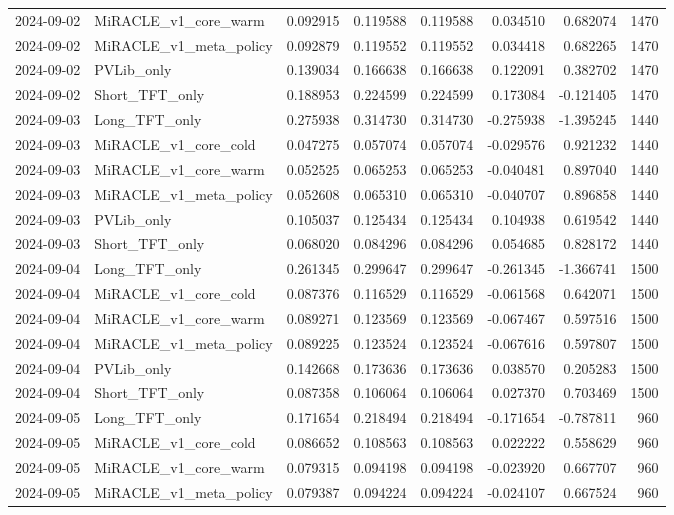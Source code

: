 \begin{tabular}{llrrrrrr}
2024-09-02 & MiRACLE_v1_core_warm & 0.092915 & 0.119588 & 0.119588 & 0.034510 & 0.682074 & 1470 \\
2024-09-02 & MiRACLE_v1_meta_policy & 0.092879 & 0.119552 & 0.119552 & 0.034418 & 0.682265 & 1470 \\
2024-09-02 & PVLib_only & 0.139034 & 0.166638 & 0.166638 & 0.122091 & 0.382702 & 1470 \\
2024-09-02 & Short_TFT_only & 0.188953 & 0.224599 & 0.224599 & 0.173084 & -0.121405 & 1470 \\
2024-09-03 & Long_TFT_only & 0.275938 & 0.314730 & 0.314730 & -0.275938 & -1.395245 & 1440 \\
2024-09-03 & MiRACLE_v1_core_cold & 0.047275 & 0.057074 & 0.057074 & -0.029576 & 0.921232 & 1440 \\
2024-09-03 & MiRACLE_v1_core_warm & 0.052525 & 0.065253 & 0.065253 & -0.040481 & 0.897040 & 1440 \\
2024-09-03 & MiRACLE_v1_meta_policy & 0.052608 & 0.065310 & 0.065310 & -0.040707 & 0.896858 & 1440 \\
2024-09-03 & PVLib_only & 0.105037 & 0.125434 & 0.125434 & 0.104938 & 0.619542 & 1440 \\
2024-09-03 & Short_TFT_only & 0.068020 & 0.084296 & 0.084296 & 0.054685 & 0.828172 & 1440 \\
2024-09-04 & Long_TFT_only & 0.261345 & 0.299647 & 0.299647 & -0.261345 & -1.366741 & 1500 \\
2024-09-04 & MiRACLE_v1_core_cold & 0.087376 & 0.116529 & 0.116529 & -0.061568 & 0.642071 & 1500 \\
2024-09-04 & MiRACLE_v1_core_warm & 0.089271 & 0.123569 & 0.123569 & -0.067467 & 0.597516 & 1500 \\
2024-09-04 & MiRACLE_v1_meta_policy & 0.089225 & 0.123524 & 0.123524 & -0.067616 & 0.597807 & 1500 \\
2024-09-04 & PVLib_only & 0.142668 & 0.173636 & 0.173636 & 0.038570 & 0.205283 & 1500 \\
2024-09-04 & Short_TFT_only & 0.087358 & 0.106064 & 0.106064 & 0.027370 & 0.703469 & 1500 \\
2024-09-05 & Long_TFT_only & 0.171654 & 0.218494 & 0.218494 & -0.171654 & -0.787811 & 960 \\
2024-09-05 & MiRACLE_v1_core_cold & 0.086652 & 0.108563 & 0.108563 & 0.022222 & 0.558629 & 960 \\
2024-09-05 & MiRACLE_v1_core_warm & 0.079315 & 0.094198 & 0.094198 & -0.023920 & 0.667707 & 960 \\
2024-09-05 & MiRACLE_v1_meta_policy & 0.079387 & 0.094224 & 0.094224 & -0.024107 & 0.667524 & 960 \\

\end{tabular}
